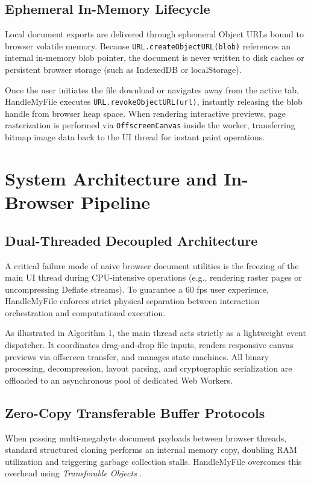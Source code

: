 \documentclass[journal]{IEEEtran}
\begin{document}
\subsection{Ephemeral In-Memory Lifecycle}
Local document exports are delivered through ephemeral Object URLs bound to browser volatile memory. Because \texttt{URL.createObjectURL(blob)} references an internal in-memory blob pointer, the document is never written to disk caches or persistent browser storage (such as IndexedDB or localStorage). 

Once the user initiates the file download or navigates away from the active tab, HandleMyFile executes \texttt{URL.revokeObjectURL(url)}, instantly releasing the blob handle from browser heap space. When rendering interactive previews, page rasterization is performed via \texttt{OffscreenCanvas} inside the worker, transferring bitmap image data back to the UI thread for instant paint operations.

\section{System Architecture and In-Browser Pipeline}

\subsection{Dual-Threaded Decoupled Architecture}
A critical failure mode of naive browser document utilities is the freezing of the main UI thread during CPU-intensive operations (e.g., rendering raster pages or uncompressing Deflate streams). To guarantee a 60 fps user experience, HandleMyFile enforces strict physical separation between interaction orchestration and computational execution.

As illustrated in Algorithm 1, the main thread acts strictly as a lightweight event dispatcher. It coordinates drag-and-drop file inputs, renders responsive canvas previews via offscreen transfer, and manages state machines. All binary processing, decompression, layout parsing, and cryptographic serialization are offloaded to an asynchronous pool of dedicated Web Workers.

\subsection{Zero-Copy Transferable Buffer Protocols}
When passing multi-megabyte document payloads between browser threads, standard structured cloning performs an internal memory copy, doubling RAM utilization and triggering garbage collection stalls. HandleMyFile overcomes this overhead using \textit{Transferable Objects} \cite{whatwg2024workers}.
\end{document}
